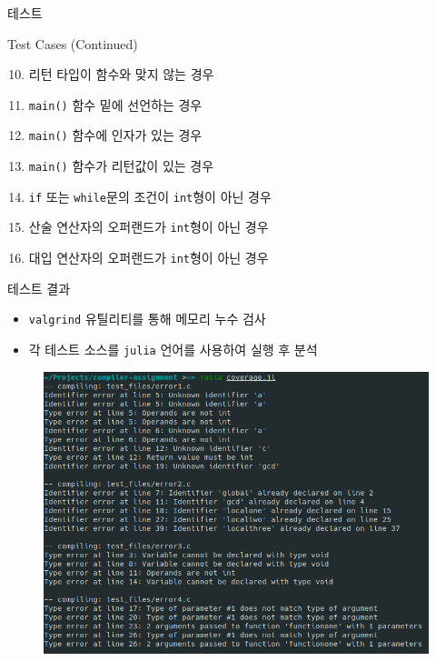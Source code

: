 \documentclass{bredelebeamer}
\def\code#1{\texttt{#1}}
\begin{document}
\begin{frame}{테스트}
	\begin{block}{Test Cases (Continued)}
		\begin{enumerate}
			\setcounter{enumi}{9}
			\item 리턴 타입이 함수와 맞지 않는 경우
			\item \code{main()} 함수 밑에 선언하는 경우
			\item \code{main()} 함수에 인자가 있는 경우
			\item \code{main()} 함수가 리턴값이 있는 경우
			\item \code{if} 또는 \code{while}문의 조건이 \code{int}형이 아닌 경우
			\item 산술 연산자의 오퍼랜드가 \code{int}형이 아닌 경우
			\item 대입 연산자의 오퍼랜드가 \code{int}형이 아닌 경우
		\end{enumerate}
	\end{block}
\end{frame}


\begin{frame}{테스트 결과}
	\begin{itemize}
		\item \code{valgrind} 유틸리티를 통해 메모리 누수 검사
		\item 각 테스트 소스를 \code{julia} 언어를 사용하여 실행 후 분석
	\end{itemize}
	\begin{figure}
		\includegraphics[scale=0.4]{images/coverage.png}
	\end{figure}
\end{frame}
\end{document}
